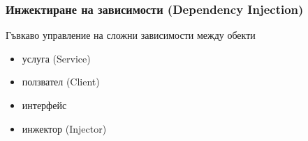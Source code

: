 \documentclass[alsotrans]{beamerswitch}
\begin{document}
\begin{frame}
  \frametitle{Инжектиране на зависимости (Dependency Injection)}

  \begin{purpose}
    Гъвкаво управление на сложни зависимости между обекти
  \end{purpose}

  \pause
  \vspace{2ex}
  \comps
  \begin{itemize}[<+->]
  \item услуга (Service)
  \item ползвател (Client)
  \item интерфейс
  \item инжектор (Injector)
  \end{itemize}
\end{frame}
\end{document}
